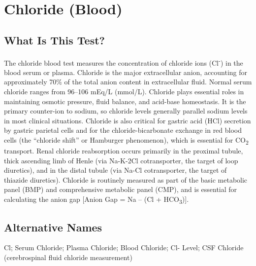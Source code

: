 \chapter{Chloride (Blood)}

\section*{What Is This Test?}
The chloride blood test measures the concentration of chloride ions (Cl\textsuperscript{-}) in the blood serum or plasma. Chloride is the major extracellular anion, accounting for approximately 70\% of the total anion content in extracellular fluid. Normal serum chloride ranges from 96--106 mEq/L (mmol/L). Chloride plays essential roles in maintaining osmotic pressure, fluid balance, and acid-base homeostasis. It is the primary counter-ion to sodium, so chloride levels generally parallel sodium levels in most clinical situations. Chloride is also critical for gastric acid (HCl) secretion by gastric parietal cells and for the chloride-bicarbonate exchange in red blood cells (the ``chloride shift'' or Hamburger phenomenon), which is essential for CO\textsubscript{2} transport. Renal chloride reabsorption occurs primarily in the proximal tubule, thick ascending limb of Henle (via Na-K-2Cl cotransporter, the target of loop diuretics), and in the distal tubule (via Na-Cl cotransporter, the target of thiazide diuretics). Chloride is routinely measured as part of the basic metabolic panel (BMP) and comprehensive metabolic panel (CMP), and is essential for calculating the anion gap [Anion Gap = Na -- (Cl + HCO\textsubscript{3})].

\section*{Alternative Names}
Cl; Serum Chloride; Plasma Chloride; Blood Chloride; Cl- Level; CSF Chloride (cerebrospinal fluid chloride measurement)

